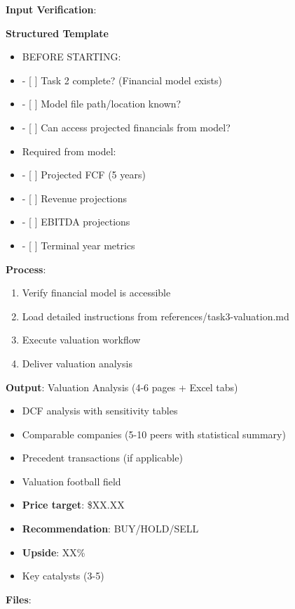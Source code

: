 \documentclass[11pt]{article}
\begin{document}
\textbf{Input Verification}:

\textbf{Structured Template}
\begin{itemize}[leftmargin=*,itemsep=2pt,topsep=2pt]
\item {} BEFORE STARTING:
\item {} - [ ] Task 2 complete? (Financial model exists)
\item {} - [ ] Model file path/location known?
\item {} - [ ] Can access projected financials from model?
\item {} Required from model:
\item {} - [ ] Projected FCF (5 years)
\item {} - [ ] Revenue projections
\item {} - [ ] EBITDA projections
\item {} - [ ] Terminal year metrics
\end{itemize}

\textbf{Process}:

\begin{enumerate}[leftmargin=*,itemsep=2pt,topsep=2pt]
\item {} Verify financial model is accessible
\item {} Load detailed instructions from references/task3-valuation.md
\item {} Execute valuation workflow
\item {} Deliver valuation analysis
\end{enumerate}

\textbf{Output}: Valuation Analysis (4-6 pages + Excel tabs)

\begin{itemize}[leftmargin=*,itemsep=2pt,topsep=2pt]
\item {} DCF analysis with sensitivity tables
\item {} Comparable companies (5-10 peers with statistical summary)
\item {} Precedent transactions (if applicable)
\item {} Valuation football field
\item {} \textbf{Price target}: \$XX.XX
\item {} \textbf{Recommendation}: BUY/HOLD/SELL
\item {} \textbf{Upside}: XX\%
\item {} Key catalysts (3-5)
\end{itemize}

\textbf{Files}:
\end{document}
